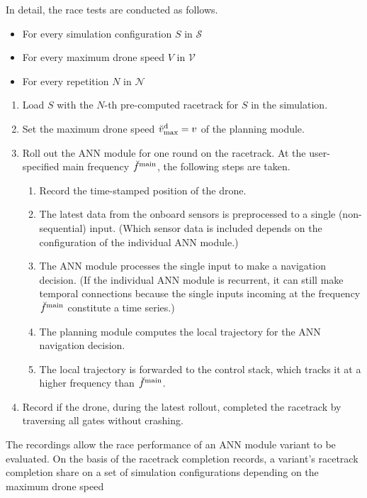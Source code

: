 In detail, the race tests are conducted as follows.
\begin{itemize}
    \item For every simulation configuration $S$ in $\mathcal{S}$
    \item For every maximum drone speed $V$ in $\mathcal{V}$
    \item For every repetition $N$ in $\mathcal{N}$
\end{itemize}
\begin{enumerate}
    \item Load $S$ with the $N$-th pre-computed racetrack for $S$ in the simulation.
    \item Set the maximum drone speed $\speed[\user]{\drone}{\mxm}{}{} = v$
    of the planning module.
    \item Roll out the ANN module for one round on the racetrack.
    At the user-specified main frequency $\freq[\user]{\main}{}{}{}$, 
    the following steps are taken.
    \begin{enumerate}
        \item Record the time-stamped position of the drone.
        \item The latest data from the onboard sensors is preprocessed
        to a single (non-sequential) input.
        (Which sensor data is included depends on the configuration of the individual ANN module.)
        \item The ANN module processes the single input
        to make a navigation decision. 
        (If the individual ANN module is recurrent, it can still make temporal connections
        because the single inputs incoming at the frequency $\freq[\user]{\main}{}{}{}$
        constitute a time series.)
        \item The planning module computes the local trajectory for the ANN navigation decision.
        \item The local trajectory is forwarded to the control stack,
        which tracks it at a higher frequency than $\freq[\user]{\main}{}{}{}$.
    \end{enumerate}
    \item Record if the drone, during the latest rollout, 
    completed the racetrack
    by traversing all gates without crashing. 
\end{enumerate}
The recordings allow the race performance 
of an ANN module variant to be evaluated.
On the basis of the racetrack completion records,
a variant's racetrack completion share
on a set of simulation configurations 
depending on the maximum drone speed
